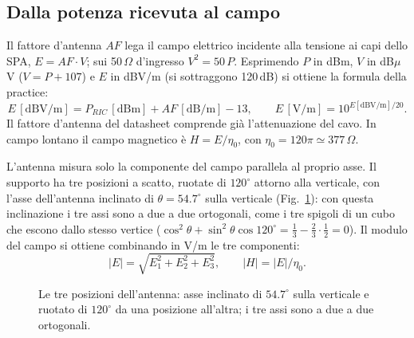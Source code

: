 \documentclass[11pt,a4paper,oneside]{book}
\begin{document}
\subsection{Dalla potenza ricevuta al campo}
Il fattore d'antenna $AF$ lega il campo elettrico incidente alla tensione ai capi dello SPA, $E = AF \cdot V$; sui 50\,$\Omega$ d'ingresso $V^2 = 50\,P$. Esprimendo $P$ in dBm, $V$ in dB$\mu$V ($V = P + 107$) e $E$ in dBV/m (si sottraggono 120\,dB) si ottiene la formula della practice:
\begin{equation}
E\,[\mathrm{dBV/m}] = P_{RIC}\,[\mathrm{dBm}] + AF\,[\mathrm{dB/m}] - 13,
\qquad E\,[\mathrm{V/m}] = 10^{E[\mathrm{dBV/m}]/20}.
\label{eq:5_campo}
\end{equation}
Il fattore d'antenna del datasheet comprende già l'attenuazione del cavo. In campo lontano il campo magnetico è $H = E/\eta_0$, con $\eta_0 = 120\pi \simeq 377\,\Omega$.

L'antenna misura solo la componente del campo parallela al proprio asse. Il supporto ha tre posizioni a scatto, ruotate di $120^\circ$ attorno alla verticale, con l'asse dell'antenna inclinato di $\theta = 54.7^\circ$ sulla verticale (Fig.~\ref{fig:5_4_posizioni}): con questa inclinazione i tre assi sono a due a due ortogonali, come i tre spigoli di un cubo che escono dallo stesso vertice ($\cos^2\theta + \sin^2\theta\cos 120^\circ = \tfrac13 - \tfrac23\cdot\tfrac12 = 0$). Il modulo del campo si ottiene combinando in V/m le tre componenti:
\begin{equation}
|E| = \sqrt{E_1^2 + E_2^2 + E_3^2}, \qquad |H| = |E|/\eta_0 .
\label{eq:5_modulo}
\end{equation}

\begin{figure}[H]
\centering
{}
\caption{Le tre posizioni dell'antenna: asse inclinato di $54.7^\circ$ sulla verticale e ruotato di $120^\circ$ da una posizione all'altra; i tre assi sono a due a due ortogonali.}
\label{fig:5_4_posizioni}
\end{figure}
\end{document}
